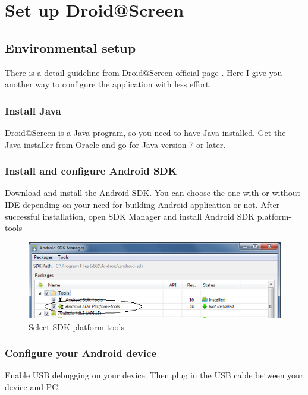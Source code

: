 \chapter{Set up Droid@Screen}
\label{ch:droid_setup}
\section{Environmental setup}
There is a detail guideline from Droid@Screen official page \cite{droid_setup}. Here I give you another way to configure the application with less effort.

\subsection{Install Java}
Droid@Screen is a Java program, so you need to have Java installed. Get the Java installer from Oracle and go for Java version 7 or later.

\subsection{Install and configure Android SDK}
Download and install the Android SDK. You can choose the one with or without IDE depending on your need for building Android application or not.
\newline
After successful installation, open SDK Manager and install Android SDK platform-tools
    
    \begin{figure}[H]
		\centering
		\includegraphics[scale=0.75]{Chapters/Fig/sdk_mng.png}
		\caption{Select SDK platform-tools}
		\label{fig:sdk_mng}
	\end{figure}

\subsection{Configure your Android device}
Enable USB debugging on your device. Then plug in the USB cable between your device and PC.
    
